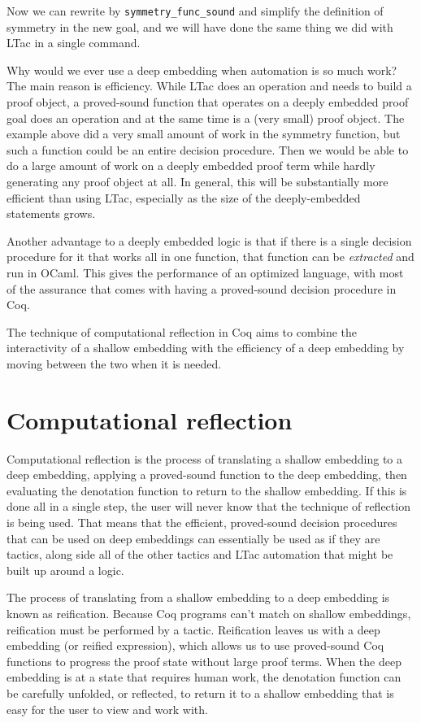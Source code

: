 \documentclass{puthesis}
\begin{document}
Now we can rewrite by \lstinline|symmetry_func_sound| and simplify the definition
of symmetry in the new goal, and we will have done the same thing we
did with LTac in a single command.

Why would we ever use a deep embedding when automation is so much
work? The main reason is efficiency. While LTac does an operation and
needs to build a proof object, a proved-sound function that operates on
a deeply embedded proof goal does an operation and at the same time is
a (very small) proof object. The example above did a very small amount
of work in the symmetry function, but such a function could be an
entire decision procedure. Then we would be able to do a large
amount of work on a deeply embedded proof term while hardly generating
any proof object at all. In general, this will be substantially more
efficient than using LTac, especially as the size of the
deeply-embedded statements grows. 

Another advantage to a deeply embedded logic is that if there is a
single decision procedure for it that works all in one function, that
function can be \emph{extracted} and run in OCaml. This gives the
performance of an optimized language, with most of the assurance that
comes with having a proved-sound decision procedure in Coq.

The technique of computational reflection in Coq aims to combine the
interactivity of a shallow embedding with the efficiency of a deep
embedding by moving between the two when it is needed.

\section{Computational reflection}

Computational reflection is the process of translating a shallow
embedding to a deep embedding, applying a proved-sound function to the
deep embedding, then evaluating the denotation function to return to
the shallow embedding. If this is done all in a single step, the user
will never know that the technique of reflection is being used. That
means that the efficient, proved-sound decision procedures that can be
used on deep embeddings can essentially be used as if they are
tactics, along side all of the other tactics and LTac automation that
might be built up around a logic. 

The process of translating from a shallow embedding to a deep
embedding is known as reification. Because Coq programs can't match on
shallow embeddings, reification must be performed by a
tactic. Reification leaves us with a deep embedding (or reified
expression), which allows us to use proved-sound Coq functions to
progress the proof state without large proof terms. When the deep
embedding is at a state that requires human work, the denotation
function can be carefully unfolded, or reflected, to return it to a
shallow embedding that is easy for the user to view and work with.
\end{document}
